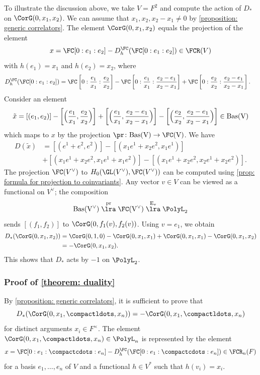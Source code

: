 \documentclass[a4paper]{amsart}
\begin{document}
\begin{example}To illustrate the discussion above, we take $V = F^2$ and compute the action of $D_*$ on $\CorG(0,x_1,x_2)$. We can assume that $x_1,x_2,x_2-x_1\neq 0$ by \cref{proposition: generic correlators}. The element $\CorG(0,x_1,x_2)$ equals the projection of the element
\[
x=\FC[0:e_1:e_2]-D^\FC_h(\FC[0:e_1:e_2])\in \FCR(V)
\]
with $h(e_1)=x_1$ and $h(e_2)=x_2$, where   
\begin{align*}
&D^\FC_h(\FC[0:e_1:e_2])=\FC\left[0:\frac{e_{1}}{x_1}:\frac{e_{2}}{x_2}\right]-\FC\left[0:\frac{e_{1}}{x_1}:\frac{e_{2}-e_{1}}{x_2-x_1}\right]+\FC\left[0:\frac{e_{2}}{x_2}:\frac{e_{2}-e_{1}}{x_2-x_1}\right].
\end{align*}
Consider an element
\[
\tilde{x}=[(e_1,e_2)]-
\left[\Bigl ( \frac{e_{1}}{x_1},\frac{e_{2}}{x_2}\Bigr)\right]+\left[\Bigl ( \frac{e_{1}}{x_1},\frac{e_{2}-e_{1}}{x_2-x_1}\Bigr)\right]
-\left[\Bigl ( \frac{e_{2}}{x_2},\frac{e_{2}-e_{1}}{x_2-x_1}\Bigr)\right]\in \rm{Bas}(V)
\]
which maps to $x$ by the projection $\pr \colon \rm{Bas}(V)\to \FC(V)$. We have
\begin{align*}
D(\tilde{x})&=[(e^1+e^2,e^2)]-
\left[(x_1e^{1}+x_2 e^{2},x_1 e^{1})\right]\\
&+\left[(x_1e^{1}+x_2 e^{2},x_1e^{1}+x_1e^2)\right]
-\left[(x_1e^{1}+x_2 e^{2}, x_2 e^{1}+x_2 e^{2})\right].
\end{align*}
The projection $\FC(V^{\vee})$ to $H_0(\GL(V^{\vee}),\FC(V^{\vee}))$ can be computed using \cref{prop: formula for projection to coinvariants}. Any vector $v\in V$ can be viewed as a functional on $V^{\vee}$; the composition 
\[
\rm{Bas}(V^\vee)\stackrel{\rm{pr}}{\lra} \FC(V^{\vee})\stackrel{E_{v}}\lra \PolyL_2
\]
sends $[(f_1,f_2)]$ to $\CorG(0, f_1(v),f_2(v))$. Using $v=e_1$, we obtain
\begin{align*}
D_*(\CorG(0,x_1,x_2))&=\CorG(0,1,0)-\CorG(0,x_1,x_1)+\CorG(0,x_1,x_1)-\CorG(0,x_1,x_2)\\ 
&=-\CorG(0,x_1,x_2).
\end{align*}
This shows that $D_*$ acts by $-1$ on $\PolyL_2$.\end{example}


\subsubsection{Proof of \cref{theorem: duality}} 
By \cref{proposition: generic correlators}, it is sufficient to prove that 
\[
D_*(\CorG(0,x_1,\compactldots,x_n))=-\CorG(0,x_1,\compactldots,x_n)
\]
for distinct arguments $x_i\in F^{\times}$. The element $\CorG(0,x_1,\compactldots,x_n)\in \PolyL_n$  is represented by the element
\[
x=\FC[0:e_1:\compactcdots:e_n]-D^\FC_h(\FC[0:e_1:\compactcdots:e_n])\in \FCR_n(F)
\]
for a basis $e_1,\dots,e_n$ of $V$ and a functional $h\in V^*$ such that $h(v_i)=x_i$. 
\end{document}
